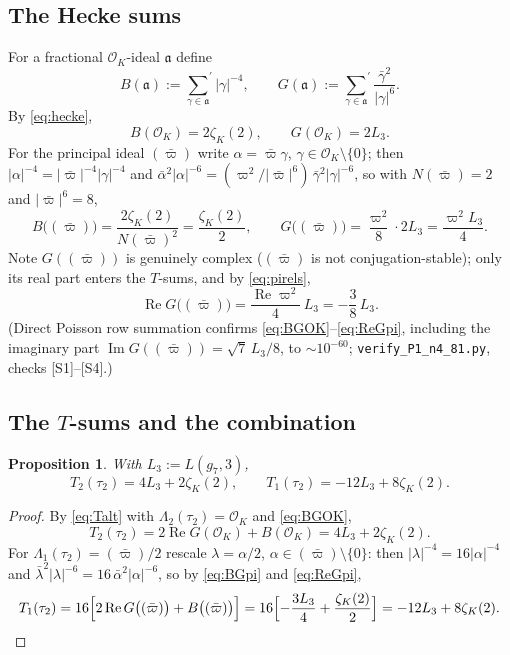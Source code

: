 \documentclass[11pt]{article}
\newtheorem{proposition}[theorem]{Proposition}
\theoremstyle{definition}
\theoremstyle{remark}
\newcommand{\cL}{\Lambda}
\newcommand{\ImT}{\operatorname{Im}}
\newcommand{\ReT}{\operatorname{Re}}
\newcommand{\OO}{\mathcal{O}}
\begin{document}
\subsection{The Hecke sums}

For a fractional $\OO_K$-ideal $\mathfrak a$ define
\[
  B(\mathfrak a):={\sum_{\gamma\in\mathfrak a}}^{\!\prime}|\gamma|^{-4},
  \qquad
  G(\mathfrak a):={\sum_{\gamma\in\mathfrak a}}^{\!\prime}
  \frac{\bar\gamma^2}{|\gamma|^6}.
\]
By \eqref{eq:hecke},
\begin{equation}\label{eq:BGOK}
  B(\OO_K)=2\zeta_K(2),\qquad G(\OO_K)=2L_3 .
\end{equation}
For the principal ideal $(\bar\varpi)$ write $\alpha=\bar\varpi\gamma$,
$\gamma\in\OO_K\setminus\{0\}$; then
$|\alpha|^{-4}=|\bar\varpi|^{-4}|\gamma|^{-4}$ and
$\bar\alpha^2|\alpha|^{-6}=(\varpi^2/|\bar\varpi|^6)\,\bar\gamma^2|\gamma|^{-6}$,
so with $N(\bar\varpi)=2$ and $|\bar\varpi|^6=8$,
\begin{equation}\label{eq:BGpi}
  B\bigl((\bar\varpi)\bigr)=\frac{2\zeta_K(2)}{N(\bar\varpi)^2}
  =\frac{\zeta_K(2)}2,
  \qquad
  G\bigl((\bar\varpi)\bigr)=\frac{\varpi^2}8\cdot 2L_3=\frac{\varpi^2L_3}4 .
\end{equation}
Note $G((\bar\varpi))$ is genuinely complex ($(\bar\varpi)$ is not
conjugation-stable); only its real part enters the $T$-sums, and by
\eqref{eq:pirels},
\begin{equation}\label{eq:ReGpi}
  \ReT G\bigl((\bar\varpi)\bigr)
  =\frac{\ReT\varpi^2}4\,L_3=-\frac{3}{8}\,L_3 .
\end{equation}
(Direct Poisson row summation confirms \eqref{eq:BGOK}--\eqref{eq:ReGpi},
including the imaginary part $\ImT G((\bar\varpi))=\sqrt7\,L_3/8$, to
$\sim10^{-60}$; \texttt{verify\_P1\_n4\_81.py}, checks [S1]--[S4].)

\subsection{The \texorpdfstring{$T$}{T}-sums and the combination}

\begin{proposition}\label{prop:Teval4}
With $L_3:=L(g_7,3)$,
\begin{equation}\label{eq:Teval4}
  T_2(\tau_2)=4L_3+2\zeta_K(2),\qquad
  T_1(\tau_2)=-12L_3+8\zeta_K(2).
\end{equation}
\end{proposition}
\begin{proof}
By \eqref{eq:Talt} with $\cL_2(\tau_2)=\OO_K$ and \eqref{eq:BGOK},
\[
  T_2(\tau_2)=2\ReT G(\OO_K)+B(\OO_K)=4L_3+2\zeta_K(2).
\]
For $\cL_1(\tau_2)=(\bar\varpi)/2$ rescale $\lambda=\alpha/2$,
$\alpha\in(\bar\varpi)\setminus\{0\}$: then $|\lambda|^{-4}=16|\alpha|^{-4}$
and $\bar\lambda^2|\lambda|^{-6}=16\,\bar\alpha^2|\alpha|^{-6}$, so by
\eqref{eq:BGpi} and \eqref{eq:ReGpi},
\[
  T_1(\tau_2)=16\Bigl[2\ReT G\bigl((\bar\varpi)\bigr)
   +B\bigl((\bar\varpi)\bigr)\Bigr]
  =16\Bigl[-\frac{3L_3}4+\frac{\zeta_K(2)}2\Bigr]
  =-12L_3+8\zeta_K(2). \qedhere
\]
\end{proof}
\end{document}
